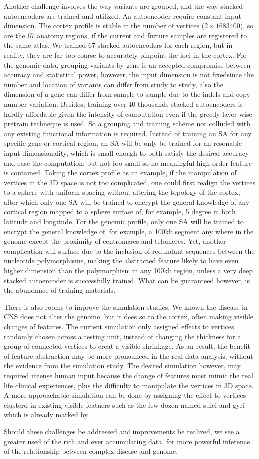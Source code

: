 Another challenge involves the way variants are grouped, and the way stacked autoencoders are trained and utilized. An autoencoder require constant input dimension. The cortex profile is stable in the number of vertices ($2 \times 1683400$), so are the 67 anatomy regions, if the current and furture samples are registered to the same atlas. We trained 67 stacked autoencoders for each region, but in reality, they are far too coarse to accurately pinpoint the loci in the cortex. For the genomic data, grouping variants by gene is an accepted compromise between accuracy and statistical power, however, the input dimension is not fixedsince the number and location of variants can differ from study to study, also the dimension of a gene can differ from sample to sample due to the indels and copy number variation. Besides, training over $40$ thousands stacked autoencoders is hardly affordable given the intensity of computation even if the greedy layer-wise pretrain techneque is used. So a grouping and training scheme not colluded with any existing functional information is required. Instead of training an SA for any specific gene or cortical region, an SA will be only be trained for an resonable input dimensionality, which is small enough to both satisfy the desired accuracy and ease the computation, but not too small so no meaningful high order feature is contained. Taking the cortex profile as an example, if the manipulation of vertices in the 3D space is not too complicated, one could first realign the vertices to a sphere with uniform spacing without altering the topology of the cortex, after which only one SA will be trained to encrypt the general knowledge of any cortical region mapped to a sphere surface of, for example, 5 degree in both latitude and longitude. For the genomic profile, only one SA will be trained to encrypt the general knowledge of, for example, a 100kb segment any where in the genome except the proximity of centromeres and telomeres. Yet, another complication will surface due to the inclusion of redundant sequences between the nucleotide polymorphisms, making the abstracted feature likely to have even higher dimension than the polymorphism in any 100kb region, unless a very deep stacked autoencoder is successfully trained. What can be guaranteed however, is the abundance of training materials.

There is also rooms to improve the simulation studies. We known the disease in CNS does not alter the genome, but it does so to the cortex, often making visible changes of features. The current simulation only assigned effects to vertices randomly chosen across a testing unit, instead of changing the thickness for a group of connected vertices to creat a visible shrinkage. As an result, the benefit of feature abstraction may be more pronounced in the real data analysis, without the evidence from the simulation study. The desired simulation however, may required intense human input because the change of features must mimic the real life clinical experiences, plus the difficulty to manipulate the vertices in 3D space. A more approachable simulation can be done by assigning the effect to vertices clusterd in existing visible featuers such as the few dozen named sulci and gyri which is already marked by \FS.

Should these challenges be addressed and improvements be realized, we see a greater used of the rich and ever accumulating data, for more powerful inference of the relationship between complex disease and genome.
